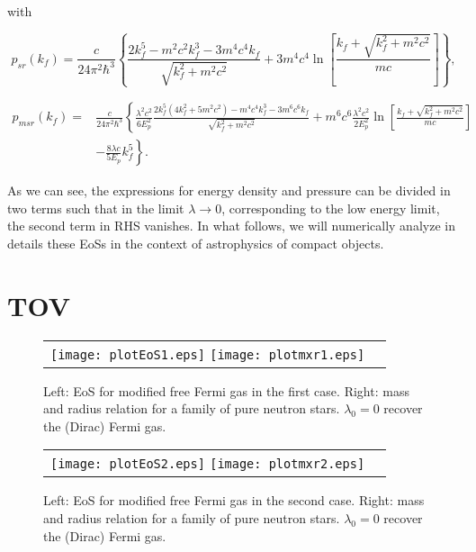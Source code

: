 \documentclass[final,5p,times,twocolumn]{elsarticle}
\begin{document}
with
\begin{widetext}

\begin{equation}
     p_{sr}(k_f)= \frac{c}{24 \pi^2 \hbar^3} \left\{ \frac{2 k_f^5 - m^2 c^2 k_f^3 -3 m^4 c^4 k_f}{\sqrt{k_f^2 + m^2 c^2}} + 3 m^4 c^4 \ln \left[ \frac{k_f + \sqrt{k_f^2 + m^2 c^2}}{m c} \right] \right\} 
      \label{eq21},
\end{equation}

\begin{equation}
\begin{split}
     p_{msr}(k_f)=& \frac{c}{24 \pi^2 \hbar^3} \left\{ \frac{\lambda^2 c^2}{6 E_p^2} \frac{2 k_f^5 \left( 4 k_f^2+ 5 m^2 c^2\right) - m^4 c^4 k_f^3 -3 m^6 c^6 k_f}{\sqrt{k_f^2 + m^2 c^2}} + m^6 c^6 \frac{\lambda^2 c^2}{2 E_p^2} \ln \left[ \frac{k_f + \sqrt{k_f^2 + m^2 c^2}}{m c} \right] \right. \\
     & \left. -\frac{8 \lambda c}{5 E_p} k_f^5 \right\}.   
\end{split}
 \label{eq22}
\end{equation}

\end{widetext}
As we can see, the expressions for energy density and pressure can  be divided in two terms such that in the limit $\lambda\rightarrow 0$, corresponding to the low energy limit, the second term in RHS vanishes. 
In what follows, we will numerically analyze in details these EoSs in the context of astrophysics of compact objects.

\section{TOV}\label{TOV}

\begin{figure*}[h]
\centering
\begin{tabular}{ll}
\texttt{[image: plotEoS1.eps]}
\texttt{[image: plotmxr1.eps]}
\end{tabular}
\caption{Left: EoS for modified free Fermi gas in the first case. Right: mass and radius relation for a family of pure neutron stars. $\lambda_0 = 0$ recover the (Dirac) Fermi gas.}
\label{fig1}
\end{figure*}

\begin{figure*}[h]
\centering
\begin{tabular}{ll}
\texttt{[image: plotEoS2.eps]}
\texttt{[image: plotmxr2.eps]}
\end{tabular}
\caption{Left: EoS for modified free Fermi gas in the second case. Right: mass and radius relation for a family of pure neutron stars. $\lambda_0 = 0$ recover the (Dirac) Fermi gas.}
\label{fig2}
\end{figure*}
\end{document}
